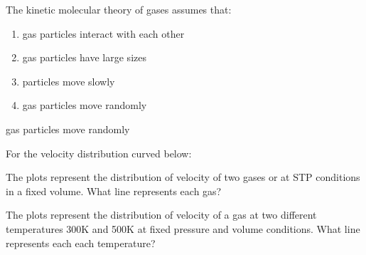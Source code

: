 \documentclass[main.tex]{subfiles}
\begin{document}
\begin{multicols*}{2}
\begin{question}[ID=\the\value{numA}]
The kinetic molecular theory of gases assumes that:
\noindent
  \begin{enumerate} [topsep=0pt, partopsep=1pt, label=(\alph*), leftmargin=0.5cm]	
\item gas particles interact with each other
\item gas particles have large sizes
\item particles move slowly
\item gas particles move randomly
\end{enumerate}
\end{question}
\begin{solution}
gas particles move randomly
\hspace{0.1cm}\end{solution}%


\begin{question}[ID=\the\value{numA}]
For the velocity distribution curved below:
\begin{inparaenum}[(a)]	
\item  The plots represent the distribution of velocity of two gases  or  at STP conditions in a fixed volume. What line represents each gas?
\item  The plots represent the distribution of velocity of a gas at two different temperatures 300K and 500K at fixed pressure and volume conditions. What line represents each each temperature?
\end{inparaenum} 



\end{question}
\end{multicols*}
\end{document}
